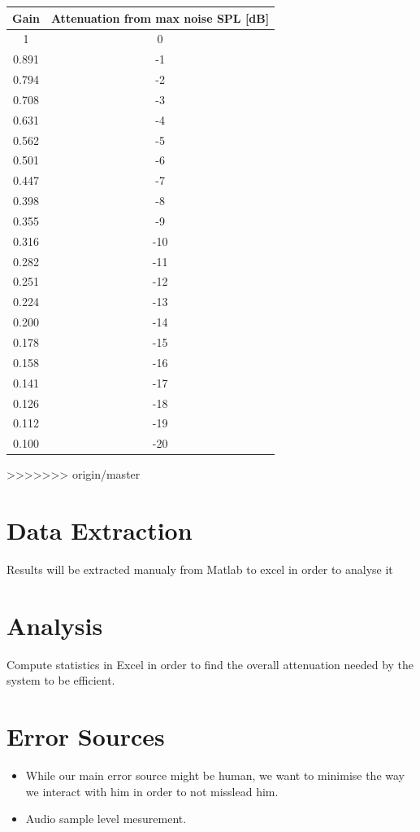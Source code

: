 \documentclass[12pt,a4paper]{article}
\begin{document}
\begin{tabular}{c | c} \toprule 
Gain & Attenuation from max noise SPL [dB]  \\ \toprule
1 		& 0   \\
0.891 	& -1  \\
0.794	& -2  \\
0.708	& -3  \\
0.631	& -4  \\
0.562	& -5  \\
0.501	& -6  \\
0.447	& -7  \\
0.398	& -8  \\
0.355	& -9  \\
0.316	& -10 \\
0.282 	& -11  \\
0.251	& -12  \\
0.224	& -13  \\
0.200	& -14  \\
0.178	& -15  \\
0.158	& -16  \\
0.141	& -17  \\
0.126	& -18  \\
0.112	& -19  \\
0.100	& -20 \\ \bottomrule

\end{tabular}
>>>>>>> origin/master

\vspace{1cm}
\section{Data Extraction}

Results will be extracted manualy from Matlab to excel in order to analyse it

\vspace{1cm}
\section{Analysis}

Compute statistics in Excel in order to find the overall attenuation needed by the system to be efficient.
\vspace{1cm}

\section{Error Sources}
\begin{itemize}
\item While our main error source might be human, we want to minimise the way we interact with him in order to not misslead him.
\item Audio sample level mesurement.
\end{itemize}
\end{document}
